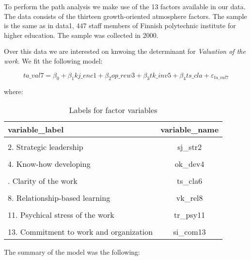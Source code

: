 \documentclass[
]{article}
\begin{document}
To perform the path analysis we make use of the 13 factors available in
our data. The data consists of the thirteen growth-oriented atmosphere
factors. The sample is the same as in data1, 447 staff members of
Finnish polytechnic institute for higher education. The sample was
collected in 2000.

Over this data we are interested on knwoing the determinant for
\emph{Valuation of the work}. We fit the following model:

\[ta\_val7 = \beta_0 + \beta_1 kj\_enc1 + \beta_2 op\_rew3 + \beta_3 tk\_inv5 + \beta_4ts\_cla + \varepsilon_{ta\_val7}\]

where:

\begin{table}[!h]

\caption{\label{tab:var_names}Labels for factor variables}
\centering
\begin{tabular}[t]{lc}
\toprule
\textbf{variable\_label} & \textbf{variable\_name}\\
\midrule
\cellcolor{gray!6}{1. Encouraging leadership} & \cellcolor{gray!6}{kj\_enc1}\\
2. Strategic leadership & sj\_str2\\
\cellcolor{gray!6}{3. Know-how rewarding} & \cellcolor{gray!6}{op\_rew3}\\
4. Know-how developing & ok\_dev4\\
\cellcolor{gray!6}{5. Incentive value of the work} & \cellcolor{gray!6}{tk\_inv5}\\
\addlinespace
6. Clarity of the work & ts\_cla6\\
\cellcolor{gray!6}{7. Valuation of the work} & \cellcolor{gray!6}{ta\_val7}\\
8. Relationship-based learning & vk\_rel8\\
\cellcolor{gray!6}{9. Team spirit} & \cellcolor{gray!6}{rh\_tes9}\\
11. Psychical stress of the work & tr\_psy11\\
\addlinespace
\cellcolor{gray!6}{12. Build-up of work requirements} & \cellcolor{gray!6}{tv\_bui12}\\
13. Commitment to work and organization & si\_com13\\
\bottomrule
\end{tabular}
\end{table}

The summary of the model was the following:
\end{document}
